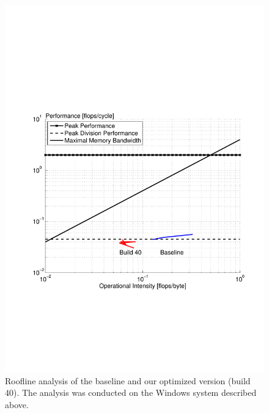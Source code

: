 \begin{figure}\centering
    \includegraphics[scale=0.48, trim={2cm 6.5cm 1cm 8.5cm},clip]{graphics/roofline_mixed.pdf}
  \caption{Roofline analysis of the baseline and our optimized version (build 40). The analysis was conducted on the Windows system described above.\label{roofline-mixed}}
\end{figure}

